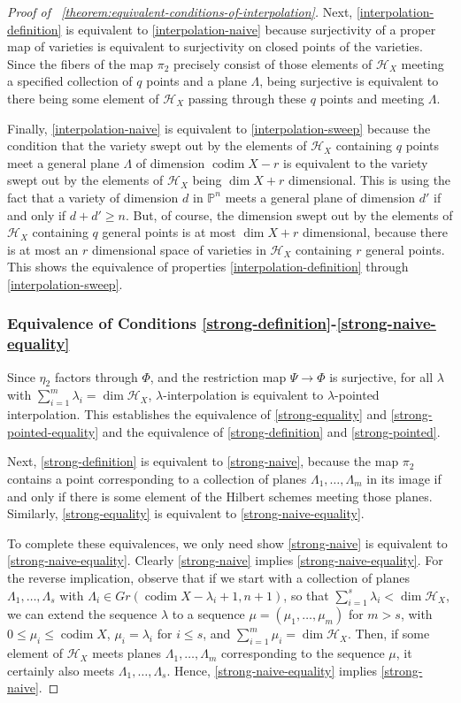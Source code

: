 \documentclass[reqno, 11pt]{amsart}
\theoremstyle{definition}
\theoremstyle{remark}
\numberwithin{equation}{section}
\numberwithin{thm}{section}
\numberwithin{prop}{section}
\numberwithin{lem}{section}
\numberwithin{cor}{section}
\numberwithin{conj}{section}
\numberwithin{defn}{section}
\theoremstyle{plain}
\theoremstyle{definition}
\newcommand\sssec{\subsubsection}
\newcommand\bp{{\mathbb P}}
\newcommand\sch{\mathscr H}
\newcommand \hilb[1]{\sch_{#1}}
\DeclareMathOperator\codim{codim}
\begin{document}
\begin{proof}[Proof of ~\autoref{theorem:equivalent-conditions-of-interpolation}]
Next, \ref{interpolation-definition} is equivalent to
\ref{interpolation-naive} because surjectivity of a proper map
of varieties is equivalent to surjectivity on closed points of the varieties.
Since the fibers of the map $\pi_2$ precisely consist of those
elements of $\hilb X$ meeting a specified collection of $q$ points
and a plane $\Lambda$, being surjective is equivalent to there
being some element of $\hilb X$ passing through these $q$ points and meeting $\Lambda$.

Finally, \ref{interpolation-naive} is equivalent to \ref{interpolation-sweep}
because the condition that the variety swept out by the elements of $\hilb X$
containing $q$ points
meet a general plane $\Lambda$ of dimension $\codim X - r$ is equivalent
to the variety swept out by the elements of $\hilb X$ being
$\dim X + r$ dimensional.
This is using the fact that a variety of dimension $d$ in $\bp^n$
meets a general plane of dimension $d'$ if and only if $d + d' \geq n$.
But, of course, the dimension swept out by the elements of $\hilb X$
containing $q$ general points is at most $\dim X + r$ dimensional, because
there is at most an $r$ dimensional space of varieties in $\hilb X$
containing $r$ general points.
This shows the equivalence of properties \ref{interpolation-definition}
through \ref{interpolation-sweep}.

\sssec{Equivalence of Conditions \ref{strong-definition}-\ref{strong-naive-equality}
}

Since $\eta_2$ factors through $\Phi$, and the restriction map
$\Psi \rightarrow \Phi$ is surjective, for all $\lambda$ with $\sum_{i=1}^m \lambda_i = \dim \hilb X$, $\lambda$-interpolation is equivalent
to $\lambda$-pointed interpolation. This establishes the equivalence
of \ref{strong-equality} and \ref{strong-pointed-equality}
and the equivalence of \ref{strong-definition} and \ref{strong-pointed}.

Next, \ref{strong-definition} is equivalent to \ref{strong-naive},
because the map $\pi_2$ contains a point corresponding to a
collection of planes $\Lambda_1, \ldots, \Lambda_m$ in its image
if and only if there is some element of the Hilbert
schemes meeting those planes. Similarly,
\ref{strong-equality} is equivalent to \ref{strong-naive-equality}.

To complete these equivalences, we only need show \ref{strong-naive} is equivalent to \ref{strong-naive-equality}. Clearly \ref{strong-naive} implies \ref{strong-naive-equality}. For the reverse implication, observe that if we start with a collection
of planes $\Lambda_1, \ldots, \Lambda_s$ with $\Lambda_i \in Gr(\codim X - \lambda_i  + 1, n+1)$, so that $\sum_{i=1}^s \lambda_i < \dim \hilb X$, we can extend the sequence $\lambda$ to a sequence $\mu = \left( \mu_1, \ldots, \mu_m \right)$
for $m > s$,
with
$0 \leq \mu_i \leq \codim X$, 
$\mu_i = \lambda_i$ for $i \leq s$, and $\sum_{i=1}^m \mu_i = \dim \hilb X$. Then, if some element of $\hilb X$ meets planes $\Lambda_1, \ldots, \Lambda_m$ corresponding to the sequence $\mu$, it certainly
also meets $\Lambda_1, \ldots, \Lambda_s$. Hence, \ref{strong-naive-equality} implies \ref{strong-naive}.



\end{proof}
\end{document}
